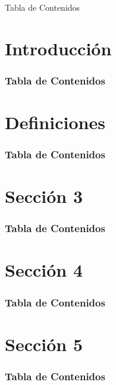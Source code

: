 \documentclass[xcolor=dvipsname]{beamer}
\title{\Titulo}
\subtitle{\Autor}
\author{\Nombre}
\institute{
  Departamento de Matemática\\
  Universidad Técnica Federico Santa María}
\date{\today}
\begin{document}
\begin{frame}
  \titlepage
\end{frame}

\begin{frame}{Tabla de Contenidos}
  \tableofcontents
\end{frame}

\section{Introducción}

    \begin{frame}
        \frametitle{Tabla de Contenidos}
        \tableofcontents[currentsection]
    \end{frame}

    
    
\section{Definiciones}
    \begin{frame}
        \frametitle{Tabla de Contenidos}
        \tableofcontents[currentsection]
    \end{frame}

    
    
\section{Sección 3}
    \begin{frame}
        \frametitle{Tabla de Contenidos}
        \tableofcontents[currentsection]
    \end{frame}

    
    
\section{Sección 4}
    \begin{frame}
        \frametitle{Tabla de Contenidos}
        \tableofcontents[currentsection]
    \end{frame}

    
    
\section{Sección 5}
    \begin{frame}
        \frametitle{Tabla de Contenidos}
        \tableofcontents[currentsection]
    \end{frame}
    
    
\end{document}
